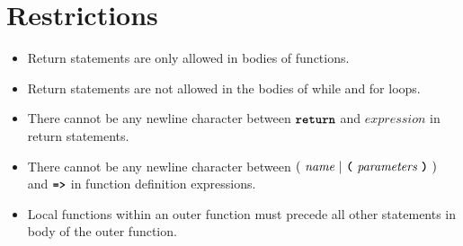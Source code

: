 \section*{Restrictions}

\begin{itemize}
\item Return statements are only allowed in bodies of functions.
\item Return statements are not allowed in the bodies of while and for loops.
\item There cannot be any newline character between
$\textbf{\texttt{return}}$ and $\textit{expression}$ in return statements.
\item There cannot be any newline character between
  $(\ \textit{name}\ | \ \textbf{\texttt{(}}\ \textit{parameters}\ \textbf{\texttt{)}}\ )$
                                               and
$\texttt{\textbf{=>}}$ in function definition expressions.
\item Local functions within an outer function
  must precede all other statements in body of the outer function.
\end{itemize}
